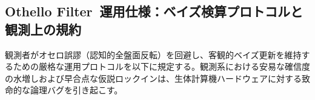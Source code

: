 \subsection*{Othello Filter\texttrademark\ 運用仕様：ベイズ検算プロトコルと観測上の規約}

観測者がオセロ誤謬（認知的全盤面反転）を回避し、客観的ベイズ更新を維持するための厳格な運用プロトコルを以下に規定する。観測系における安易な確信度の水増しおよび早合点な仮説ロックインは、生体計算機ハードウェアに対する致命的な論理バグを引き起こす。

